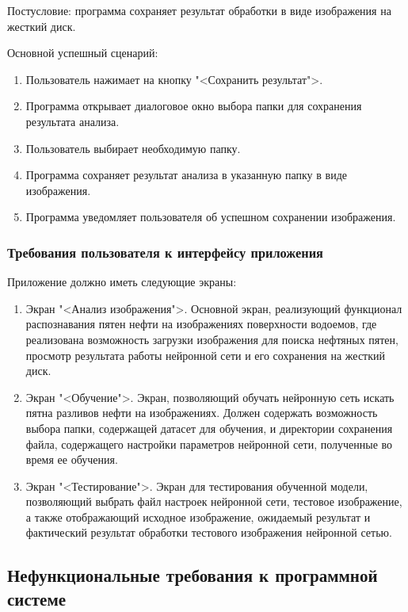 Постусловие: программа сохраняет результат обработки в виде изображения на жесткий диск.

Основной успешный сценарий:

\begin{enumerate}
	\item Пользователь нажимает на кнопку "<Сохранить результат">.
	\item Программа открывает диалоговое окно выбора папки для сохранения результата анализа.
	\item Пользователь выбирает необходимую папку.
	\item Программа сохраняет результат анализа в указанную папку в виде изображения.
	\item Программа уведомляет пользователя об успешном сохранении изображения.
\end{enumerate}

\subsubsection{Требования пользователя к интерфейсу приложения}

Приложение должно иметь следующие экраны:

\begin{enumerate}
	\item Экран "<Анализ изображения">. Основной экран, реализующий функционал распознавания пятен нефти на изображениях поверхности водоемов, где реализована возможность загрузки изображения для поиска нефтяных пятен, просмотр результата работы нейронной сети и его сохранения на жесткий диск.
	\item Экран "<Обучение">. Экран, позволяющий обучать нейронную сеть искать пятна разливов нефти на изображениях. Должен содержать возможность выбора папки, содержащей датасет для обучения, и директории сохранения файла, содержащего настройки параметров нейронной сети, полученные во время ее обучения.
	\item Экран "<Тестирование">. Экран для тестирования обученной модели, позволяющий выбрать файл настроек нейронной сети, тестовое изображение, а также отображающий исходное изображение, ожидаемый результат и фактический результат обработки тестового изображения нейронной сетью.
\end{enumerate}

\subsection{Нефункциональные требования к программной системе}

